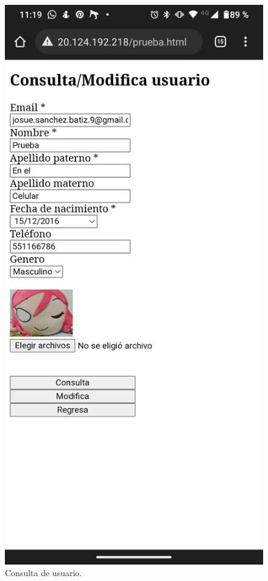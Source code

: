 \documentclass[11pt]{article}
\begin{document}
		\begin{figure}[H]
			\centering
			\includegraphics[scale=0.18]{resources/Screenshot_20211219-231927.png}
			\caption{Consulta de usuario.}\label{fig:picture}
		\end{figure}
\end{document}

